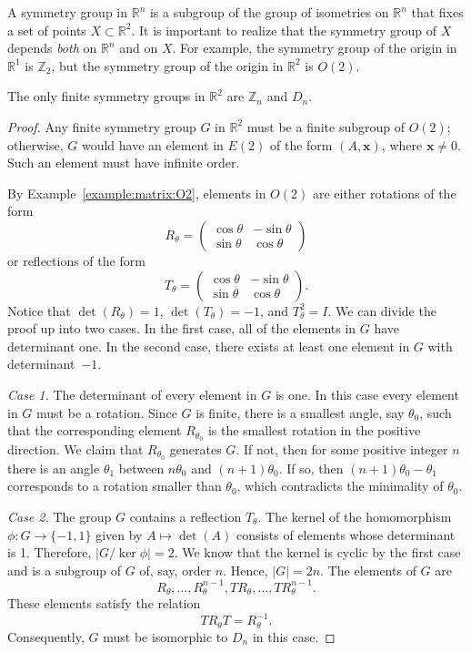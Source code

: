  
A {\bfi symmetry group\/} in ${\mathbb R}^n$ is a
subgroup of the group of isometries on ${\mathbb R}^n$ that fixes a set
of points $X \subset {\mathbb R}^2$.  It is important to realize that the
symmetry group of $X$ depends {\em both\/} on ${\mathbb R}^n$ and on
$X$. For example, the symmetry group of the origin in ${\mathbb R}^1$ is
${\mathbb Z}_2$, but the symmetry group of the origin in ${\mathbb R}^2$ is
$O(2)$. 
 
 
\begin{theorem}
The only finite symmetry groups in ${\mathbb R}^2$ are ${\mathbb Z}_n$ and
$D_n$. 
\end{theorem}
 
 
\begin{proof}
Any finite symmetry group $G$ in ${\mathbb R}^2$ must be a finite
subgroup of $O(2)$; otherwise, $G$ would have an element in $E(2)$ of
the form $(A, {\mathbf x})$, where ${\mathbf x} \neq 0$.  Such an element
must have infinite order. 
 
 
By Example~\ref{example:matrix:O2}, elements in $O(2)$ are either rotations of the form
\[
R_{\theta}
=
\begin{pmatrix}
\cos \theta & - \sin \theta \\
\sin \theta & \cos \theta
\end{pmatrix}
\]
or reflections of the form
\[T_{\theta}
=
\begin{pmatrix}
\cos \theta & - \sin \theta \\
\sin \theta & \cos \theta
\end{pmatrix}.
\]
Notice that $\det(R_{\theta})=1$,  $\det(T_{\theta})=-1$,
and $T_{\theta}^2=I$. We can divide the proof up into two cases.  In
the first case, all of the elements in $G$ have determinant one. In the
second case, there exists at least one element in $G$ with 
determinant~$-1$.  
 
 
{\em Case 1.}  
The determinant of every element in $G$ is one. In this case every
element in $G$ must be a rotation. Since $G$ is finite, there is a
smallest angle, say $\theta_0$, such that the corresponding element
$R_{\theta_0}$ is the smallest rotation in the positive direction.  We
claim that $R_{\theta_0}$ generates $G$.  If not, then for some
positive integer $n$ there is an angle $\theta_1$ between $n \theta_0$
and $(n+1) \theta_0$. If so, then $(n+1) \theta_0 - \theta_1$
corresponds to a rotation smaller than $\theta_0$, which contradicts
the minimality of $\theta_0$.   
 
 
 
{\em Case 2.}  
The group $G$ contains a reflection $T_{\theta}$.  The kernel of the
homomorphism $\phi : G \rightarrow \{-1, 1\}$ given by $A \mapsto
\det(A)$ consists of elements whose determinant is 1.  Therefore, $|G/
\ker \phi|=2$.  We know that the kernel is cyclic by the first case
and is a subgroup of $G$ of, say, order $n$. Hence, $|G| = 2n$. The
elements of $G$ are
\[
R_{\theta}, \ldots, R_{\theta}^{n-1},  TR_{\theta}, \ldots,
TR_{\theta}^{n-1}.
\]
These elements satisfy the relation
\[
TR_{\theta}T = R_{\theta}^{-1}.
\]
Consequently, $G$ must be isomorphic to $D_n$ in this case.
\end{proof}
 
